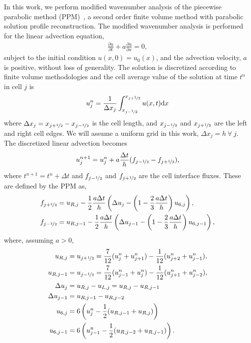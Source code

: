 \documentclass[review]{elsarticle}
\begin{document}
In this work, we perform modified wavenumber analysis of the piecewise
parabolic method (PPM)~\cite{Colella1984}, a second order finite
volume method with parabolic solution profile reconstruction. The
modified wavenumber analysis is performed for the linear advection
equation,
\begin{align}
  \label{eq:linear_advection}
  \frac{\partial u}{\partial t} + a \frac{\partial u}{\partial x} = 0,
\end{align}
subject to the initial condition $u(x,0) = u_0(x)$, and the advection
velocity, $a$ is positive, without loss of generality. The solution is
discretized according to finite volume methodologies and the cell
average value of the solution at time $t^n$ in cell $j$ is
\begin{align}
  \label{eq:fv}
  u^n_j = \frac{1}{\Delta x_j} \int_{x_{j-\nicefrac{1}{2}}}^{x_{j+\nicefrac{1}{2}}} u(x,t) \mathrm{d}x
\end{align}
where $\Delta x_j = x_{j+\nicefrac{1}{2}} - x_{j-\nicefrac{1}{2}}$ is
the cell length, and $x_{j-\nicefrac{1}{2}}$ and
$x_{j+\nicefrac{1}{2}}$ are the left and right cell edges. We will
assume a uniform grid in this work, $\Delta x_j = h~\forall~j$. The
discretized linear advection becomes
\begin{align}
  \label{eq:discrete_advection}
  u^{n+1}_j = u^n_j + a \frac{\Delta t}{h} (f_{j-\nicefrac{1}{2}} - f_{j+\nicefrac{1}{2}}),
\end{align}
where $t^{n+1} = t^n + \Delta t$ and $f_{j-\nicefrac{1}{2}}$ and
$f_{j+\nicefrac{1}{2}}$ are the cell interface fluxes. These are
defined by the PPM as,
\begin{align}
  \label{eq:fluxes}
  f_{j+\nicefrac{1}{2}} &= u_{R,j} - \frac{1}{2} \frac{a \Delta t}{h} \left( \Delta u_j - \left( 1-\frac{2}{3} \frac{a \Delta t}{h} \right) u_{6,j} \right),\\
  f_{j-\nicefrac{1}{2}} &= u_{R,j-1} - \frac{1}{2} \frac{a \Delta t}{h} \left( \Delta u_{j-1} - \left( 1-\frac{2}{3} \frac{a \Delta t}{h} \right) u_{6,j-1} \right),
\end{align}
where, assuming $a>0$,
\begin{align*}
  u_{R,j} &= u_{j+\nicefrac{1}{2}} = \frac{7}{12} (u_j^n + u_{j+1}^n) - \frac{1}{12} (u_{j+2}^n + u_{j-1}^n),\\
  u_{R,j-1} &= u_{j-\nicefrac{1}{2}} = \frac{7}{12} (u_{j-1}^n + u_{j}^n) - \frac{1}{12} (u_{j+1}^n + u_{j-2}^n),\\
  \Delta u_j &= u_{R,j} - u_{L,j} = u_{R,j} - u_{R,j-1}\\
  \Delta u_{j-1} &= u_{R,j-1} - u_{R,j-2}\\
  u_{6,j} &= 6 \left( u_j^n - \frac{1}{2} (u_{R,j-1} + u_{R,j}) \right)\\
  u_{6,j-1} &= 6 \left( u_{j-1}^n - \frac{1}{2} (u_{R,j-2} + u_{R,j-1}) \right).
\end{align*}
\end{document}
